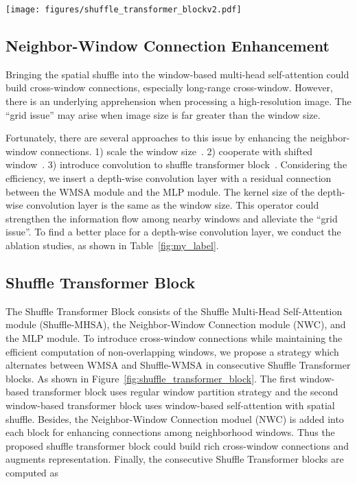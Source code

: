 \documentclass{article}
\begin{document}
\begin{figure*}[!t]
    \centering
    \texttt{[image: figures/shuffle\_transformer\_blockv2.pdf]}
    \caption{Two successive Shuffle Transformer Block. The WMSA and Shuffle WMSA are window-based multi-head self attention without/with spatial shuffle, respectively.
    }
    \label{fig:shuffle_transformer_block}
    \vspace{0mm}
\end{figure*}

\subsection{Neighbor-Window Connection Enhancement}
Bringing the spatial shuffle into the window-based multi-head self-attention could build cross-window connections, especially long-range cross-window. However, there is an underlying apprehension when processing a high-resolution image. The ``grid issue'' may arise when image size is far greater than the window size. 

Fortunately, there are several approaches to this issue by enhancing the neighbor-window connections. 1) scale the window size~\cite{vaswani2021scaling}. 2) cooperate with shifted window~\cite{liu2021Swin}. 3) introduce convolution to shuffle transformer block~\cite{li2021localvit,wu2021cvt}. Considering the efficiency, we insert a depth-wise convolution layer with a residual connection between the WMSA module and the MLP module. The kernel size of the depth-wise convolution layer is the same as the window size. This operator could strengthen the information flow among nearby windows and alleviate the ``grid issue''. To find a better place for a depth-wise convolution layer, we conduct the ablation studies, as shown in Table~\ref{fig:my_label}.

\subsection{Shuffle Transformer Block}
The Shuffle Transformer Block consists of the Shuffle Multi-Head Self-Attention module (Shuffle-MHSA), the Neighbor-Window Connection module (NWC), and the MLP module.
To introduce cross-window connections while maintaining the efficient computation of non-overlapping windows, we propose a strategy which alternates between WMSA and Shuffle-WMSA in consecutive Shuffle Transformer blocks. As shown in Figure~\ref{fig:shuffle_transformer_block}. The first window-based transformer block uses regular window partition strategy and the second window-based transformer block uses window-based self-attention with spatial shuffle. Besides, the Neighbor-Window Connection moduel (NWC) is added into each block for enhancing connections among neighborhood windows. Thus the proposed shuffle transformer block could build rich cross-window connections and augments representation.  Finally, the consecutive Shuffle Transformer blocks are computed as
\end{document}
